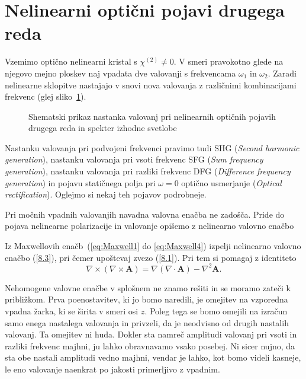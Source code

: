 \section{Nelinearni optični pojavi drugega reda}
Vzemimo optično nelinearni kristal s $\chi^{(2)} \neq 0$. V smeri pravokotno 
glede na njegovo mejno ploskev naj vpadata dve valovanji s frekvencama
$\omega_{1}$ in $\omega_{2}$. Zaradi nelinearne sklopitve nastajajo v snovi nova 
valovanja z različnimi kombinacijami frekvenc (glej sliko~\ref{fig:nl2}).
\begin{figure}[h]
\centering
\def\svgwidth{140truemm} 

\caption{Shematski prikaz nastanka valovanj pri nelinearnih optičnih pojavih drugega reda in spekter
izhodne svetlobe}
\label{fig:nl2}
\end{figure}

Nastanku valovanja pri podvojeni frekvenci pravimo tudi
SHG ({\it Second harmonic 
generation}), 
nastanku valovanja pri vsoti frekvenc SFG
({\it Sum frequency generation}), 
nastanku valovanja pri razliki frekvenc DFG 
({\it Difference frequency generation}) in pojavu 
statičnega polja pri $\omega = 0$ optično usmerjanje
({\it Optical rectification}). Oglejmo si nekaj teh pojavov podrobneje. 

Pri močnih vpadnih valovanjih navadna valovna enačba ne zadošča. Pride do pojava
nelinearne polarizacije in valovanje opišemo z nelinearno valovno enačbo

\begin{definition}
Iz Maxwellovih enačb~(\ref{eq:Maxwell1} do \ref{eq:Maxwell4}) izpelji 
nelinearno valovno enačbo (\ref{8.3}), pri čemer upoštevaj zvezo (\ref{8.1}). 
Pri tem si pomagaj z identiteto
$$
\nabla \times (\nabla \times \mathbf{A}) = \nabla (\nabla \cdot \mathbf{A}) 
- \nabla^2 \mathbf{A}.
$$
\end{definition} 

Nehomogene valovne enačbe v splošnem ne znamo rešiti in se moramo zateči k približkom.
Prva poenostavitev, ki jo bomo naredili, je omejitev na vzporedna vpadna žarka,
ki se širita v smeri osi $z$. Poleg tega se bomo omejili na izračun samo enega
nastalega valovanja in privzeli, da je neodvisno od drugih nastalih valovanj.
Ta omejitev ni huda. Dokler sta namreč amplitudi valovanj pri vsoti in razliki
frekvenc majhni, ju lahko obravnavamo vsako posebej. Ni sicer nujno,
da sta obe nastali amplitudi vedno majhni, vendar je lahko, kot bomo videli kasneje, 
le eno valovanje naenkrat po jakosti primerljivo z vpadnim. 


